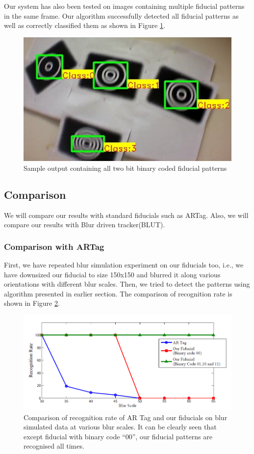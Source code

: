 \documentclass[runningheads]{llncs}
\begin{document}
Our system has also been tested on images containing multiple fiducial patterns
in the same frame. Our algorithm successfully detected all fiducial patterns as
well as correctly classified them as shown in Figure \ref{fig:output_all}.
\begin{figure}
\centering
  \includegraphics[width=.8\linewidth]{output_all_2.jpg}
  \caption{Sample output containing all two bit binary coded fiducial patterns}
  \label{fig:output_all}
\end{figure}

\subsection{Comparison}
We will compare our results with standard fiducials such as ARTag. Also, we will
compare our results with Blur driven tracker(BLUT)\cite{Wu:2011}.
\subsubsection{Comparison with ARTag}
First, we have repeated blur simulation experiment on our fiducials too, i.e.,
we have downsized our fiducial to size 150x150 and blurred it along various
orientations with different blur scales. Then, we tried to detect the patterns
using algorithm presented in earlier section. The comparison of recognition
rate is shown in Figure \ref{fig:recognition_rate}.

\begin{figure}
\centering
\includegraphics[width=\linewidth]{recognition_rate.png}
\caption{Comparison of recognition rate of AR Tag and our fiducials on
blur simulated data at various blur scales. It can be clearly seen that except
fiducial with binary code ``00'', our fiducial patterns are 
recognised all times.}
\label{fig:recognition_rate}
\end{figure}
\end{document}
